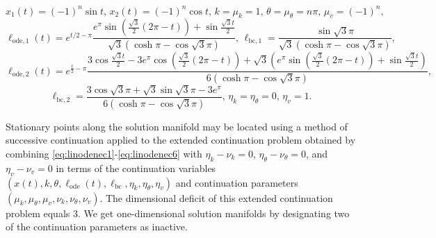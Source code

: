 \begin{equation}
x_1(t)=(-1)^n\sin t,\,x_2(t)=(-1)^n\cos t,\,k=\mu_k=1,\,\theta=\mu_\theta=n\pi,\,\mu_v=(-1)^n,
\end{equation}
\begin{equation}
\ell_{\mathrm{ode},1}(t)=e^{t/2-\pi}\frac{e^\pi\sin\left(\frac{\sqrt{3}}{2}(2\pi-t)\right)+\sin\frac{\sqrt{3}t}{2}}{\sqrt{3}(\cosh\pi-\cos\sqrt{3}\pi)},\,\ell_{\mathrm{bc},1}=\frac{\sin\sqrt{3}\pi}{\sqrt{3}(\cosh\pi-\cos\sqrt{3}\pi)},
\end{equation}
\begin{equation}
\ell_{\mathrm{ode},2}(t)=e^{\frac{t}{2}-\pi}\frac{3\cos\frac{\sqrt{3}t}{2}-3e^\pi\cos\left(\frac{\sqrt{3}}{2}(2\pi-t)\right)+\sqrt{3}\left(e^\pi \sin\left(\frac{\sqrt{3}}{2}(2\pi-t)\right)+\sin\frac{\sqrt{3}t}{2}\right)}{6(\cosh\pi-\cos\sqrt{3}\pi)},
\end{equation}
\begin{equation}
\ell_{\mathrm{bc},2}=\frac{3\cos\sqrt{3}\pi+\sqrt{3}\sin\sqrt{3}\pi-3e^\pi}{6(\cosh\pi-\cos\sqrt{3}\pi)},\,\eta_k=\eta_\theta=0,\,\eta_v=1.
\end{equation}

Stationary points along the solution manifold may be located using a method of successive continuation applied to the extended continuation problem obtained by combining \eqref{eq:linodenec1}-\eqref{eq:linodenec6} with $\eta_k-\nu_k=0$, $\eta_\theta-\nu_\theta=0$, and $\eta_v-\nu_v=0$ in terms of the continuation variables $\left(x(t),k,\theta,\ell_\mathrm{ode}(t),\ell_\mathrm{bc},\eta_k,\eta_\theta,\eta_v\right)$ and continuation parameters $(\mu_k,\mu_\theta,\mu_v,\nu_k,\nu_\theta,\nu_v)$. The dimensional deficit of this extended continuation problem equals $3$. We get one-dimensional solution manifolds by designating two of the continuation parameters as inactive.

